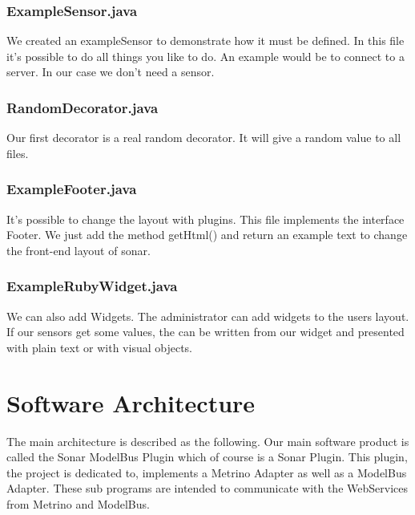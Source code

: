 \subsubsection{ExampleSensor.java}

We created an exampleSensor to demonstrate how it must be defined. In this file it's possible to do all things you like to do. An example would be to connect to a server. In our case we don't need a sensor.

\subsubsection{RandomDecorator.java}

Our first decorator is a real random decorator. It will give a random value to all files.

\subsubsection{ExampleFooter.java}

It's possible to change the layout with plugins. This file implements the interface Footer. We just add the method getHtml() and return an example text to change the front-end layout of sonar.

\subsubsection{ExampleRubyWidget.java}

We can also add Widgets. The administrator can add widgets to the users layout. If our sensors get some values, the can be written from our widget and presented with plain text or with visual objects.

\section{Software Architecture}
The main architecture is described as the following. Our main software product is called the Sonar ModelBus Plugin which of course is a Sonar Plugin. This plugin, the project is dedicated to, implements a Metrino Adapter as well as a ModelBus Adapter. These sub programs are intended to communicate with the WebServices from Metrino and ModelBus.

